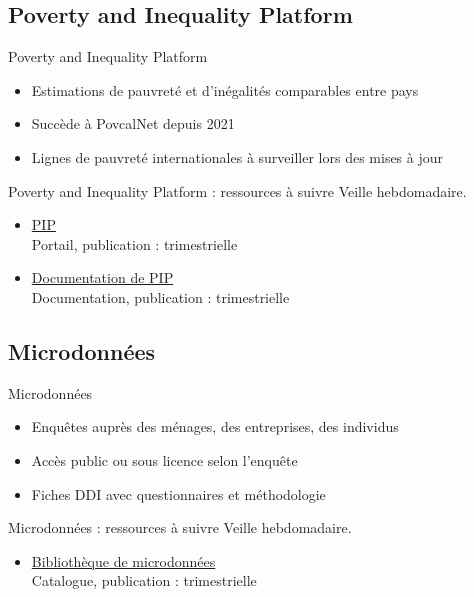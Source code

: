 \documentclass[aspectratio=169,11pt]{beamer}
\begin{document}
\subsection{Poverty and Inequality Platform}
\begin{frame}{Poverty and Inequality Platform}
\begin{itemize}
\item Estimations de pauvreté et d'inégalités comparables entre pays
\item Succède à PovcalNet depuis 2021
\item Lignes de pauvreté internationales à surveiller lors des mises à jour
\end{itemize}
\end{frame}

\begin{frame}{Poverty and Inequality Platform : ressources à suivre}
\small
Veille hebdomadaire.
\begin{itemize}
\item \href{https://pip.worldbank.org}{PIP}\\{\footnotesize Portail, publication : trimestrielle}
\item \href{https://pip.worldbank.org/documentation}{Documentation de PIP}\\{\footnotesize Documentation, publication : trimestrielle}
\end{itemize}
\end{frame}

\subsection{Microdonnées}
\begin{frame}{Microdonnées}
\begin{itemize}
\item Enquêtes auprès des ménages, des entreprises, des individus
\item Accès public ou sous licence selon l'enquête
\item Fiches DDI avec questionnaires et méthodologie
\end{itemize}
\end{frame}

\begin{frame}{Microdonnées : ressources à suivre}
\small
Veille hebdomadaire.
\begin{itemize}
\item \href{https://microdata.worldbank.org}{Bibliothèque de microdonnées}\\{\footnotesize Catalogue, publication : trimestrielle}
\end{itemize}
\end{frame}
\end{document}
